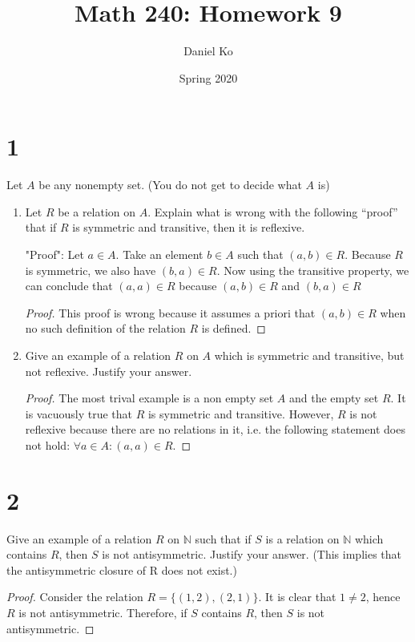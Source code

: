 \documentclass[11pt]{scrartcl}
\title{Math 240: Homework 9}
\author{Daniel Ko}
\date{Spring 2020}
\begin{document}
\maketitle

\section{1}
Let $A$ be any nonempty set. (You do not get to decide what $A$ is)
\begin{enumerate}[label=\alph*.]
\item{
	Let $R$ be a relation on $A$. Explain what is wrong with the following
	“proof” that if $R$ is symmetric and transitive, then it is reflexive.\par
	
	"Proof": Let $a \in A$. Take an element $b \in A$ such that $(a, b) \in R .$ Because $R$ is symmetric,
	we also have $(b, a) \in R$. Now using the transitive property, we can conclude that $(a, a) \in R$ because 
	$(a, b) \in R$ and $(b, a) \in R$
	\begin{proof}
		This proof is wrong because it assumes a priori that $(a, b) \in R$ when no such definition of the relation $R$ is 
		defined. 
	\end{proof}
}
\item{
	Give an example of a relation $R$ on $A$ which is symmetric and
	transitive, but not reflexive. Justify your answer.
	\begin{proof}
		The most trival example is a non empty set $A$ and the empty set $R$.   
		It is vacuously true that $R$ is symmetric and transitive.
		However, $R$ is not reflexive because there are no relations in it,
		i.e. the following statement does not hold: $\forall a \in A : (a,a) \in R$.
	\end{proof}
}
\end{enumerate}

\section{2}
Give an example of a relation $R$ on $\mathbb{N}$ such that if $S$ is a relation on $\mathbb{N}$
which contains $R$, then $S$ is not antisymmetric. Justify your answer.
(This implies that the antisymmetric closure of R does not exist.)
\begin{proof}
Consider the relation $R = \{(1,2),(2,1)\}$. It is clear that $1 \neq 2$, hence $R$ is 
not antisymmetric. Therefore, if $S$ contains $R$, then $S$ is not antisymmetric.
\end{proof}
\end{document}
